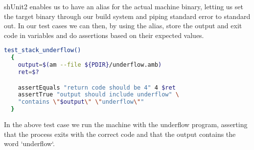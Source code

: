 shUnit2 enables us to have an alias for the actual machine binary, letting us
set the target binary through our build system and piping standard error to
standard out. In our test cases we can then, by using the alias, store the
output and exit code in variables and do assertions based on their expected
values.
\begin{lstlisting}[language={sh},caption={shUnit2 underflow test case}]
  test_stack_underflow()
  {
    output=$(am --file ${PDIR}/underflow.amb)
    ret=$?

    assertEquals "return code should be 4" 4 $ret
    assertTrue "output should include underflow" \
    "contains \"$output\" \"underflow\""
  }
\end{lstlisting}

In the above test case we run the machine with the underflow program, asserting
that the process exits with the correct code and that the output contains the
word `underflow`.
